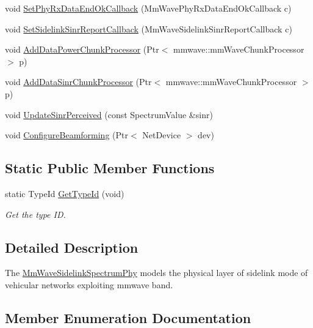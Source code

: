 \begin{DoxyCompactItemize}
\item 
void \hyperlink{classns3_1_1millicar_1_1MmWaveSidelinkSpectrumPhy_a1d67dd214d625371084795980d021a8c}{Set\+Phy\+Rx\+Data\+End\+Ok\+Callback} (Mm\+Wave\+Phy\+Rx\+Data\+End\+Ok\+Callback c)
\item 
void \hyperlink{classns3_1_1millicar_1_1MmWaveSidelinkSpectrumPhy_ae88ae2ce12c9384f8dfd2dddfa6f8049}{Set\+Sidelink\+Sinr\+Report\+Callback} (Mm\+Wave\+Sidelink\+Sinr\+Report\+Callback c)
\item 
void \hyperlink{classns3_1_1millicar_1_1MmWaveSidelinkSpectrumPhy_a2a88ce71bf01205dfcb564f9de6c8830}{Add\+Data\+Power\+Chunk\+Processor} (Ptr$<$ mmwave\+::mm\+Wave\+Chunk\+Processor $>$ p)
\item 
void \hyperlink{classns3_1_1millicar_1_1MmWaveSidelinkSpectrumPhy_acf9d93deaf45b27e497494c9b723584a}{Add\+Data\+Sinr\+Chunk\+Processor} (Ptr$<$ mmwave\+::mm\+Wave\+Chunk\+Processor $>$ p)
\item 
void \hyperlink{classns3_1_1millicar_1_1MmWaveSidelinkSpectrumPhy_a504ec60aaf6a7115b78013e1e3d18c8c}{Update\+Sinr\+Perceived} (const Spectrum\+Value \&sinr)
\item 
void \hyperlink{classns3_1_1millicar_1_1MmWaveSidelinkSpectrumPhy_aa646318e906fee1914c297eb169dd2cc}{Configure\+Beamforming} (Ptr$<$ Net\+Device $>$ dev)
\end{DoxyCompactItemize}
\subsection*{Static Public Member Functions}
\begin{DoxyCompactItemize}
\item 
static Type\+Id \hyperlink{classns3_1_1millicar_1_1MmWaveSidelinkSpectrumPhy_a751fd1b25b484a1a8d32d62d2545069c}{Get\+Type\+Id} (void)
\begin{DoxyCompactList}\small\item\em Get the type ID. \end{DoxyCompactList}\end{DoxyCompactItemize}


\subsection{Detailed Description}
The \hyperlink{classns3_1_1millicar_1_1MmWaveSidelinkSpectrumPhy}{Mm\+Wave\+Sidelink\+Spectrum\+Phy} models the physical layer of sidelink mode of vehicular networks exploiting mmwave band. 

\subsection{Member Enumeration Documentation}
\mbox{\label{classns3_1_1millicar_1_1MmWaveSidelinkSpectrumPhy_a242b6a18fa64a2063ee36fd2d7b44e84}} 

